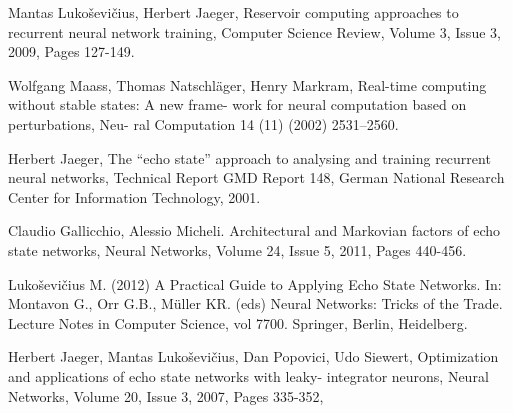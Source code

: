 Mantas Luko\v{s}evi\v{c}ius, Herbert Jaeger,
Reservoir computing approaches to recurrent neural network training,
Computer Science Review,
Volume 3, Issue 3,
2009,
Pages 127-149.

 Wolfgang Maass, Thomas Natschläger, Henry Markram,
Real-time computing without stable states: A new frame-
work for neural computation based on perturbations, Neu-
ral Computation 14 (11) (2002) 2531–2560.

 Herbert Jaeger, The “echo state” approach to analysing
and training recurrent neural networks, Technical Report
GMD Report 148, German National Research Center for
Information Technology, 2001.

Claudio Gallicchio, Alessio Micheli.
Architectural and Markovian factors of echo state networks,
Neural Networks,
Volume 24, Issue 5,
2011,
Pages 440-456.

Lukoševičius M. (2012) A Practical Guide to Applying Echo State Networks. In: Montavon G., Orr G.B., Müller KR. (eds) Neural Networks: Tricks of the Trade. Lecture Notes in Computer Science, vol 7700. Springer, Berlin, Heidelberg.

Herbert Jaeger, Mantas Lukoševičius, Dan Popovici, Udo Siewert,
Optimization and applications of echo state networks with leaky- integrator neurons,
Neural Networks,
Volume 20, Issue 3,
2007,
Pages 335-352,



